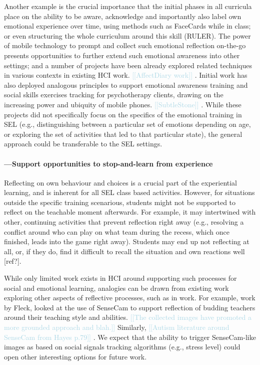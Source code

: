 \documentclass[prodmode,acmtochi]{acmsmall}
\newcommand{\todo}[1]{\textrm{\textrm{\textcolor{LightBlue}{[[#1]]} } } }
\begin{document}
		Another example is the crucial importance that the initial phases in all curricula place on the ability to be aware, acknowledge and importantly also label own emotional experience over time, using methods such as FaceCards while in class; or even structuring the whole curriculum around this skill (RULER). The power of mobile technology to prompt and collect such emotional reflection on-the-go presents opportunities to further extend such emotional awareness into other settings; and a number of projects have been already explored related techniques in various contexts in existing HCI work. \todo{AffectDiary work}.  Initial work has also deployed analogous principles to support emotional awareness training \cite{Matthews2011} and social skills exercises tracking \cite{DeSa2010} for psychotherapy clients, drawing on the increasing power and ubiquity of mobile phones. \todo{SubtleStone}. 
%
While these projects did not specifically focus on the specifics of the emotional training in SEL (e.g., distinguishing between a particular set of emotions depending on age, or exploring the set of activities that led to that particular state), the general approach could be transferable to the SEL settings. 

\paragraph{---Support opportunities to stop-and-learn from experience}
Reflecting on own behaviour and choices is a crucial part of the experiential learning, and is inherent for all SEL class based activities. However, for situations outside the specific training scenarious, students might not be supported to reflect on the teachable moment afterwards. For example, it may intertwined with other, continuing activities that prevent reflection right away (e.g., resolving a conflict around who can play on what team during the recess, which once finished, leads into the game right away). Students may end up not reflecting at all, or, if they do, find it difficult to recall the situation and own reactions well [ref?].

While only limited work exists in HCI around supporting such processes for social and emotional learning, analogies can be drawn from existing work exploring other aspects of reflective processes, such as in work. For example, work by Fleck, looked at the use of SenseCam to support reflection of budding teachers around their teaching style and abilities. \todo{The collected images have promoted a more grounded approach and blah.} Similarly, \todo{Autism literature around SenseCam from Hayes p.79}. We expect that the ability to trigger SenseCam-like images as based on social signals tracking algorithms (e.g., stress level) could open other interesting options for future work.  
\end{document}
